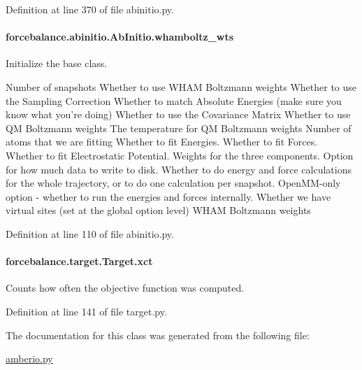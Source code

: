 Definition at line 370 of file abinitio.\-py.

\hypertarget{classforcebalance_1_1abinitio_1_1AbInitio_a885e7ef58b9e7c6abbc24321e5f3c61a}{
\paragraph[{whamboltz\-\_\-wts}]{\setlength{\rightskip}{0pt plus 5cm}forcebalance.\-abinitio.\-Ab\-Initio.\-whamboltz\-\_\-wts\hspace{0.3cm}{\ttfamily [inherited]}}}\label{classforcebalance_1_1abinitio_1_1AbInitio_a885e7ef58b9e7c6abbc24321e5f3c61a}


Initialize the base class. 

Number of snapshots Whether to use W\-H\-A\-M Boltzmann weights Whether to use the Sampling Correction Whether to match Absolute Energies (make sure you know what you're doing) Whether to use the Covariance Matrix Whether to use Q\-M Boltzmann weights The temperature for Q\-M Boltzmann weights Number of atoms that we are fitting Whether to fit Energies. Whether to fit Forces. Whether to fit Electrostatic Potential. Weights for the three components. Option for how much data to write to disk. Whether to do energy and force calculations for the whole trajectory, or to do one calculation per snapshot. Open\-M\-M-\/only option -\/ whether to run the energies and forces internally. Whether we have virtual sites (set at the global option level) W\-H\-A\-M Boltzmann weights 

Definition at line 110 of file abinitio.\-py.

\hypertarget{classforcebalance_1_1target_1_1Target_aad2e385cfbf7b4a68f1c2cb41133fe82}{
\paragraph[{xct}]{\setlength{\rightskip}{0pt plus 5cm}forcebalance.\-target.\-Target.\-xct\hspace{0.3cm}{\ttfamily [inherited]}}}\label{classforcebalance_1_1target_1_1Target_aad2e385cfbf7b4a68f1c2cb41133fe82}


Counts how often the objective function was computed. 



Definition at line 141 of file target.\-py.



The documentation for this class was generated from the following file\-:\begin{DoxyCompactItemize}
\item 
\hyperlink{amberio_8py}{amberio.\-py}\end{DoxyCompactItemize}
